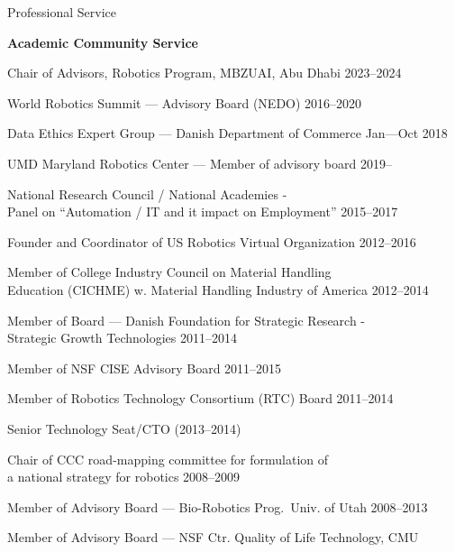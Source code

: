 \documentclass{article}
\newenvironment{sublist}{%
  \begin{list}{}{%
      \setlength{\itemsep}{0em}\setlength{\parsep}{0em}%
      \setlength{\topsep}{0em}\setlength{\parskip}{0em}%
    }%
}%
{ \end{list} }
\begin{document}
\begin{cv}
	\begin{cvlist}{Professional Service}%
		\item {\bf Academic Community Service}
		\begin{itemize}
			\item Chair of Advisors, Robotics Program, MBZUAI, Abu Dhabi
			      \cftdotfill{\cftdotsep} 2023--2024
			\item World Robotics Summit --- Advisory Board (NEDO) \cftdotfill{\cftdotsep}
			      2016--2020
			\item Data Ethics Expert Group --- Danish Department of Commerce
			      \cftdotfill{\cftdotsep} Jan---Oct 2018
			\item UMD Maryland Robotics Center --- Member of advisory board
			      \cftdotfill{\cftdotsep} 2019--
			\item National Research Council / National Academies -\\ Panel on ``Automation /
			      IT and it impact on Employment'' \cftdotfill{\cftdotsep} 2015--2017
			\item Founder and Coordinator of US Robotics Virtual Organization
			      \cftdotfill{\cftdotsep} 2012--2016
			\item Member of College Industry Council on Material Handling\\
			      Education (CICHME) w. Material Handling Industry of America
			      \cftdotfill{\cftdotsep} 2012--2014
			\item Member of Board --- Danish Foundation for Strategic Research -\\
			      Strategic Growth Technologies \cftdotfill{\cftdotsep} 2011--2014
			\item Member of NSF CISE Advisory Board \cftdotfill{\cftdotsep} 2011--2015
			\item Member of Robotics Technology Consortium (RTC) Board
			      \cftdotfill{\cftdotsep} 2011--2014
			      \begin{sublist}
				      \item Senior Technology Seat/CTO (2013--2014)
			      \end{sublist}
			\item Chair of CCC road-mapping committee for formulation of \\
			      a national strategy for robotics \cftdotfill{\cftdotsep} 2008--2009
			\item Member of Advisory Board --- Bio-Robotics Prog.\ Univ. of Utah
			      \cftdotfill{\cftdotsep} 2008--2013
			\item Member of Advisory Board --- NSF Ctr. Quality of Life Technology, CMU

\end{itemize}
\end{cvlist}
\end{cv}
\end{document}
